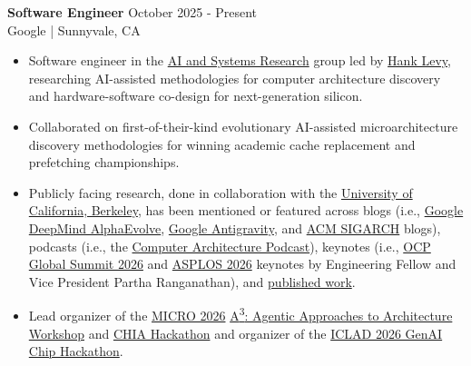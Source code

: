 \documentclass[line]{res}
\begin{document}
\begin{resume}
\textbf{Software Engineer} \hfill October 2025 - Present
\\
Google | Sunnyvale, CA
\\
\vspace{-3mm}
\begin{itemize}
\item Software engineer in the \href{https://techsysinfra.google/research/}{AI and Systems Research} group led by \href{https://techsysinfra.google/research/srg-staff/hank-levy/}{Hank Levy}, researching AI-assisted methodologies for computer architecture discovery and hardware-software co-design for next-generation silicon.
\item Collaborated on first-of-their-kind evolutionary AI-assisted microarchitecture discovery methodologies for winning academic cache replacement and prefetching championships.
\item Publicly facing research, done in collaboration with the \href{https://www.berkeley.edu/}{University of California, Berkeley}, has been mentioned or featured across blogs (i.e., \href{https://deepmind.google/blog/alphaevolve-impact/}{Google DeepMind AlphaEvolve}, \href{https://antigravity.google/blog/teamwork-when-ai-becomes-a-research-partner}{Google Antigravity}, and \href{https://www.sigarch.org/architecture-systems-are-changing-the-architects-role-in-the-era-of-agentic-co-design/}{ACM SIGARCH} blogs), podcasts (i.e., the \href{https://comparchpodcast.podbean.com/e/ep-24-from-unicorns-to-centaurs-co-designing-computer-systems-for-the-ai-era-with-dr-partha-ranganathan-google/}{Computer Architecture Podcast}), keynotes (i.e., \href{https://www.youtube.com/watch?v=3kJkux7t8VQ}{OCP Global Summit 2026} and \href{https://dl.acm.org/doi/10.1145/3779212.3795611}{ASPLOS 2026} keynotes by Engineering Fellow and Vice President Partha Ranganathan), and \href{https://scholar.google.com/citations?user=dsAQJ4cAAAAJ&hl=en}{published work}.
\item Lead organizer of the \href{https://microarch.org/micro59/}{MICRO 2026} \href{https://agentic-arch.org/index.html}{A\textsuperscript{3}: Agentic Approaches to Architecture Workshop} and \href{https://agentic-arch.org/hackathon.html}{CHIA Hackathon} and organizer of the \href{https://iclad.ai/lad25-hackathon}{ICLAD 2026 GenAI Chip Hackathon}.
\end{itemize}

\vspace{-3mm}


\end{resume}
\end{document}
